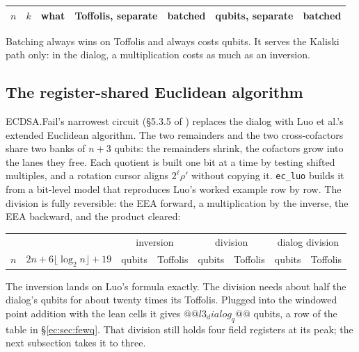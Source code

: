 \begin{center}\small
\begin{tabular}{rrlrrrr}
\toprule
$n$ & $k$ & what & Toffolis, separate & batched & qubits, separate & batched\\
\midrule
\bottomrule
\end{tabular}
\end{center}

\noindent Batching always wins on Toffolis and always costs qubits. It serves the Kaliski path only:
in the dialog, a multiplication costs as much as an inversion.

\subsection{The register-shared Euclidean algorithm}

ECDSA.Fail's narrowest circuit (\S5.3.5 of \cite{ec:ecdsafail26}) replaces the dialog with Luo et
al.'s extended Euclidean algorithm. The two remainders and the two cross-cofactors share two banks
of $n+3$ qubits: the remainders shrink, the cofactors grow into the lanes they free. Each quotient is
built one bit at a time by testing shifted multiples, and a rotation cursor aligns
$2^\ell\rho'$ without copying it. \texttt{ec\_luo} builds it from a bit-level model that
reproduces Luo's worked example row by row. The division is fully reversible: the EEA forward, a
multiplication by the inverse, the EEA backward, and the product cleared:

\begin{center}\small
\begin{tabular}{rrrrrrrr}
\toprule
& & \multicolumn{2}{c}{inversion} & \multicolumn{2}{c}{division} & \multicolumn{2}{c}{dialog division}\\
$n$ & $2n+6\lfloor\log_2n\rfloor+19$ & qubits & Toffolis & qubits & Toffolis & qubits & Toffolis\\
\midrule
\bottomrule
\end{tabular}
\end{center}

\noindent The inversion lands on Luo's formula exactly. The division needs about half the dialog's
qubits for about twenty times its Toffolis. Plugged into the windowed point addition with the lean
cells it gives $@@l3_dialog_q@@$ qubits, a row of the table in \S\ref{ec:sec:fewq}. That division
still holds four field registers at its peak; the next subsection takes it to three.

